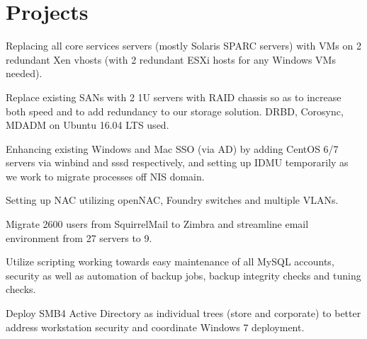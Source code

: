 \documentclass[letterpaper]{deedy-resume} %
\begin{document}
\begin{minipage}[t]{0.66\textwidth} %

\section{Projects}

Replacing all core services servers (mostly Solaris SPARC servers) with VMs on 2 redundant Xen vhosts (with 2 redundant ESXi hosts for any Windows VMs needed).
\sectionspace %

Replace existing SANs with 2 1U servers with RAID chassis so as to increase both speed and to add redundancy to our storage solution.  DRBD, Corosync, MDADM on Ubuntu 16.04 LTS used.
\sectionspace %

Enhancing existing Windows and Mac SSO (via AD) by adding CentOS 6/7 servers via winbind and sssd respectively, and setting up IDMU temporarily as we work to migrate processes off NIS domain.
\sectionspace %

Setting up NAC utilizing openNAC, Foundry switches and multiple VLANs.
\sectionspace %

Migrate 2600 users from SquirrelMail to Zimbra and streamline email environment from 27 servers to 9.
\sectionspace %

Utilize scripting working towards easy maintenance of all MySQL accounts, security as well as automation of backup jobs, backup integrity checks and tuning checks.
\sectionspace %

Deploy SMB4 Active Directory as individual trees (store and corporate) to better address workstation security and coordinate Windows 7 deployment.
\sectionspace %


\end{minipage}
\end{document}
